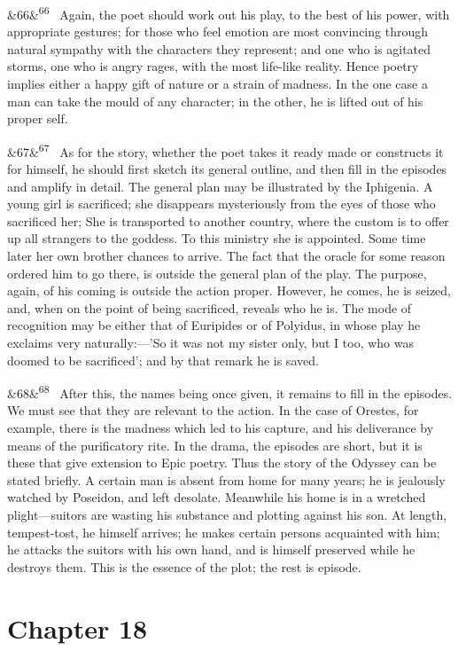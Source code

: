 \documentclass[12pt]{article}
\newcommand{\para}[1][]{\par\noindent\ifx&#1&\else\textsuperscript{\footnotesize #1}~\fi}
\begin{document}
\para[66] Again, the poet should work out his play, to the best of his power, with appropriate gestures; for those who feel emotion are most convincing through natural sympathy with the characters they represent; and one who is agitated storms, one who is angry rages, with the most life-like reality. Hence poetry implies either a happy gift of nature or a strain of madness. In the one case a man can take the mould of any character; in the other, he is lifted out of his proper self.

\para[67] As for the story, whether the poet takes it ready made or constructs it for himself, he should first sketch its general outline, and then fill in the episodes and amplify in detail. The general plan may be illustrated by the Iphigenia. A young girl is sacrificed; she disappears mysteriously from the eyes of those who sacrificed her; She is transported to another country, where the custom is to offer up all strangers to the goddess. To this ministry she is appointed. Some time later her own brother chances to arrive. The fact that the oracle for some reason ordered him to go there, is outside the general plan of the play. The purpose, again, of his coming is outside the action proper. However, he comes, he is seized, and, when on the point of being sacrificed, reveals who he is. The mode of recognition may be either that of Euripides or of Polyidus, in whose play he exclaims very naturally:---'So it was not my sister only, but I too, who was doomed to be sacrificed'; and by that remark he is saved.

\para[68] After this, the names being once given, it remains to fill in the episodes. We must see that they are relevant to the action. In the case of Orestes, for example, there is the madness which led to his capture, and his deliverance by means of the purificatory rite. In the drama, the episodes are short, but it is these that give extension to Epic poetry. Thus the story of the Odyssey can be stated briefly. A certain man is absent from home for many years; he is jealously watched by Poseidon, and left desolate. Meanwhile his home is in a wretched plight---suitors are wasting his substance and plotting against his son. At length, tempest-tost, he himself arrives; he makes certain persons acquainted with him; he attacks the suitors with his own hand, and is himself preserved while he destroys them. This is the essence of the plot; the rest is episode.

\section*{Chapter 18}
\end{document}
